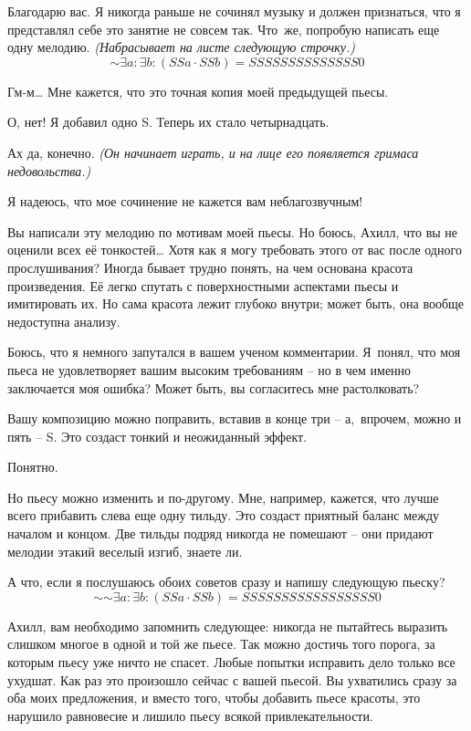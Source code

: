 \documentclass[../main.tex]{subfiles}
\begin{document}
\begin{dialogue}
 Благодарю вас. Я никогда раньше не сочинял музыку и должен признаться, что я представлял себе это занятие не совсем так. Что~же, попробую написать еще одну мелодию. \emph{(Набрасывает на листе следующую строчку.)}
\[
    \mathord{\sim} \exists a \colon \exists b \colon (SSa \cdot SSb) = SSSSSSSSSSSSSS0
\]

 Гм-м\ldots{} Мне кажется, что это точная копия моей предыдущей пьесы.

 О, нет! Я добавил одно S\@. Теперь их стало четырнадцать.

 Ах да, конечно. \emph{(Он начинает играть, и на лице его появляется гримаса недовольства.)}

 Я надеюсь, что мое сочинение не кажется вам неблагозвучным!

 Вы написали эту мелодию по мотивам моей пьесы. Но боюсь, Ахилл, что вы не оценили всех её тонкостей\ldots{} Хотя как я могу требовать этого от вас после одного прослушивания? Иногда бывает трудно понять, на чем основана красота произведения. Её легко спутать с поверхностными аспектами пьесы и имитировать их. Но сама красота лежит глубоко внутри; может быть, она вообще недоступна анализу.

 Боюсь, что я немного запутался в вашем ученом комментарии. Я~понял, что моя пьеса не удовлетворяет вашим высоким требованиям \--- но в чем именно заключается моя ошибка? Может быть, вы согласитесь мне растолковать?

 Вашу композицию можно поправить, вставив в конце три \--- а,~впрочем, можно и пять \--- S. Это создаст тонкий и неожиданный эффект.

 Понятно.

 Но пьесу можно изменить и по-другому. Мне, например, кажется, что лучше всего прибавить слева еще одну тильду. Это создаст приятный баланс между началом и концом. Две тильды подряд никогда не помешают \--- они придают мелодии этакий веселый изгиб, знаете ли.

 А что, если я послушаюсь обоих советов сразу и напишу следующую пьеску?
\[
    \mathord{\sim}\mathord{\sim} \exists a \colon \exists b \colon (SSa \cdot SSb) = SSSSSSSSSSSSSSSSS0
\]

 Ахилл, вам необходимо запомнить следующее: никогда не пытайтесь выразить слишком многое в одной и той же пьесе. Так можно достичь того порога, за которым пьесу уже ничто не спасет. Любые попытки исправить дело только все ухудшат. Как раз это произошло сейчас с вашей пьесой. Вы ухватились сразу за оба моих предложения, и вместо того, чтобы добавить пьесе красоты, это нарушило равновесие и лишило пьесу всякой привлекательности.


\end{dialogue}
\end{document}
